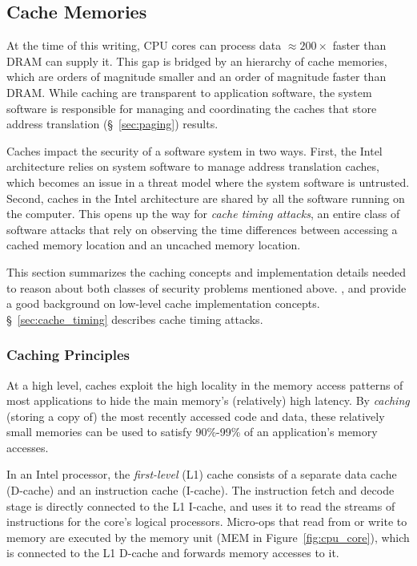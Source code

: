 \subsection{Cache Memories}
\label{sec:caching}

At the time of this writing, CPU cores can process data $\approx 200\times$
faster than DRAM can supply it. This gap is bridged by an hierarchy of cache
memories, which are orders of magnitude smaller and an order of magnitude
faster than DRAM. While caching are transparent to application software, the
system software is responsible for managing and coordinating the caches that
store address translation (\S~\ref{sec:paging}) results.

Caches impact the security of a software system in two ways. First, the Intel
architecture relies on system software to manage address translation caches,
which becomes an issue in a threat model where the system software is
untrusted. Second, caches in the Intel architecture are shared by all the
software running on the computer. This opens up the way for \textit{cache
timing attacks}, an entire class of software attacks that rely on observing the
time differences between accessing a cached memory location and an uncached
memory location.

This section summarizes the caching concepts and implementation details needed
to reason about both classes of security problems mentioned above.
\cite{smith1982cache}, \cite{patterson2013architecture} and
\cite{hennessy2012architecture} provide a good background on low-level cache
implementation concepts. \S~\ref{sec:cache_timing} describes cache timing
attacks.


\subsubsection{Caching Principles}
\label{sec:caching_intro}

At a high level, caches exploit the high locality in the memory access patterns
of most applications to hide the main memory's (relatively) high latency. By
\textit{caching} (storing a copy of) the most recently accessed code and data,
these relatively small memories can be used to satisfy 90\%-99\% of an
application's memory accesses.

In an Intel processor, the \textit{first-level} (L1) cache consists of a
separate data cache (D-cache) and an instruction cache (I-cache). The
instruction fetch and decode stage is directly connected to the L1 I-cache, and
uses it to read the streams of instructions for the core's logical processors.
Micro-ops that read from or write to memory are executed by the memory unit
(MEM in Figure~\ref{fig:cpu_core}), which is connected to the L1 D-cache and
forwards memory accesses to it.

